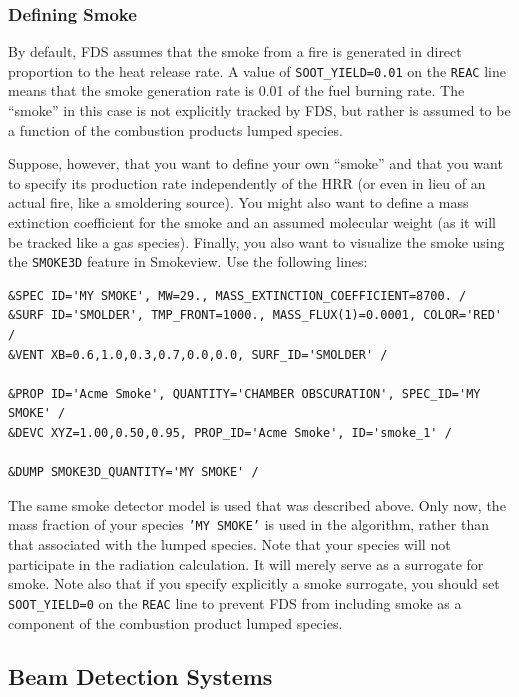 \documentclass[11pt]{book}
\newcommand{\ct}{\tt\small}
\begin{document}
\subsubsection{Defining Smoke}
\label{info:alternative_smoke}

By default, FDS assumes that the smoke from a fire is generated in direct proportion to the heat release rate. A value
of {\ct SOOT\_YIELD=0.01} on the {\ct REAC} line means that the smoke generation rate is 0.01 of the fuel burning rate. The
``smoke'' in this case is not explicitly tracked by FDS, but rather is assumed to be a function of the combustion products lumped species.

Suppose, however, that you want to define your own ``smoke'' and that you want to specify its production rate independently of
the HRR (or even in lieu of an actual fire, like a smoldering source). You might also want to define a mass extinction coefficient for the
smoke and an assumed molecular weight (as it will be tracked like a gas species). Finally, you also want to visualize the smoke using
the {\ct SMOKE3D} feature in Smokeview. Use the following lines:

\footnotesize
\begin{verbatim}
&SPEC ID='MY SMOKE', MW=29., MASS_EXTINCTION_COEFFICIENT=8700. /
&SURF ID='SMOLDER', TMP_FRONT=1000., MASS_FLUX(1)=0.0001, COLOR='RED' /
&VENT XB=0.6,1.0,0.3,0.7,0.0,0.0, SURF_ID='SMOLDER' /

&PROP ID='Acme Smoke', QUANTITY='CHAMBER OBSCURATION', SPEC_ID='MY SMOKE' /
&DEVC XYZ=1.00,0.50,0.95, PROP_ID='Acme Smoke', ID='smoke_1' /

&DUMP SMOKE3D_QUANTITY='MY SMOKE' /
\end{verbatim}
\normalsize

\noindent
The same smoke detector model is used that was described above. Only now, the mass fraction of your species {\ct 'MY SMOKE'} is used in the
algorithm, rather than that associated with the lumped species. Note that your species will not participate in the radiation calculation. It
will merely serve as a surrogate for smoke. Note also that if you specify explicitly a smoke surrogate, you should set {\ct SOOT\_YIELD=0} on the
{\ct REAC} line to prevent FDS from including smoke as a component of the combustion product lumped species.



\subsection{Beam Detection Systems}
\label{info:beam_detector}
\end{document}
